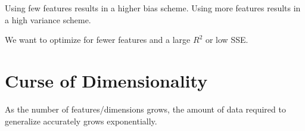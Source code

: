 \documentclass{article}
\begin{document}
Using few features results in a higher bias scheme. Using more features
results in a high variance scheme.

We want to optimize for fewer features and a large $R^2$ or low SSE.

\section{Curse of Dimensionality}

As the number of features/dimensions grows, the amount of data required to
generalize accurately grows exponentially.

\end{document}
